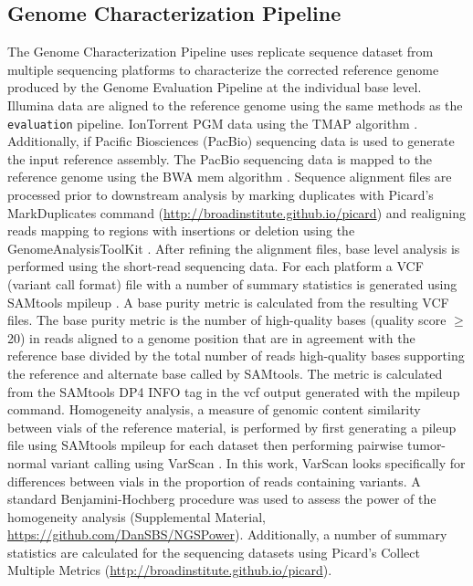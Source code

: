 \documentclass[smallextended]{svjour3}\usepackage[]{graphicx}\usepackage[]{color}
\begin{document}
\subsection{Genome Characterization Pipeline}
\label{method:3}
The Genome Characterization Pipeline uses replicate sequence dataset from multiple sequencing platforms to characterize the corrected reference genome produced by the Genome Evaluation Pipeline at the individual base level. 
Illumina data are aligned to the reference genome using the same methods as the \texttt{evaluation} pipeline. 
IonTorrent PGM data using the TMAP algorithm \cite{Homer}. 
Additionally, if Pacific Biosciences (PacBio) sequencing data is used to generate the input reference assembly. 
The PacBio sequencing data is mapped to the reference genome using the BWA mem algorithm \cite{Li2013c}. Sequence alignment files are processed prior to downstream analysis by marking duplicates with Picard's MarkDuplicates command (\url{http://broadinstitute.github.io/picard}) and realigning reads mapping to regions with insertions or deletion using the GenomeAnalysisToolKit \cite{McKenna2010,DePristo2011}. 
After refining the alignment files, base level analysis is performed using the short-read sequencing data. 
For each platform a VCF (variant call format) file with a number of summary statistics is generated using SAMtools mpileup \cite{Li2009}. 
A base purity metric is calculated from the resulting VCF files. 
The base purity metric is the number of high-quality bases (quality score $\geq$ 20) in reads aligned to a genome position that are in agreement with the reference base divided by the total number of reads high-quality bases supporting the reference and alternate base called by SAMtools. 
The metric is calculated from the SAMtools DP4 INFO tag in the vcf output generated with the mpileup command.
Homogeneity analysis, a measure of genomic content similarity between vials of the reference material, is performed by first generating a pileup file using SAMtools mpileup for each dataset then performing pairwise tumor-normal variant calling using VarScan \cite{Koboldt2009}. 
In this work, VarScan looks specifically for differences between vials in the proportion of reads containing variants. 
A standard Benjamini-Hochberg procedure was used to assess the power of the homogeneity analysis (Supplemental Material, \url{https://github.com/DanSBS/NGSPower}). 
Additionally, a number of summary statistics are calculated for the sequencing datasets using Picard's Collect Multiple Metrics (\url{http://broadinstitute.github.io/picard}). 
\end{document}
